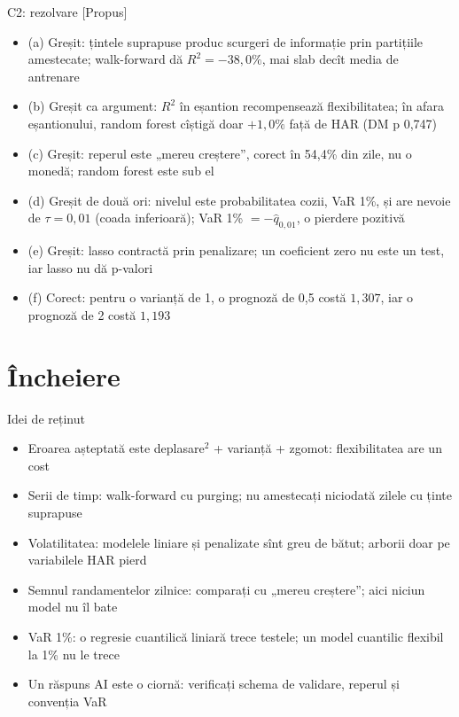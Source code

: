 \ifsolutions
\begin{frame}{C2: rezolvare [Propus]}
\itemsize{\footnotesize}
\begin{itemize}
    \item (a) Greșit: țintele suprapuse produc scurgeri de informație prin partițiile amestecate; walk-forward dă $R^2 = -38{,}0\%$, mai slab decît media de antrenare
    \item (b) Greșit ca argument: $R^2$ în eșantion recompensează flexibilitatea; în afara eșantionului, random forest cîștigă doar $+1{,}0\%$ față de HAR (DM p 0{,}747)
    \item (c) Greșit: reperul este „mereu creștere”, corect în 54{,}4\% din zile, nu o monedă; random forest este sub el
    \item (d) Greșit de două ori: nivelul este probabilitatea cozii, VaR 1\%, și are nevoie de $\tau = 0{,}01$ (coada inferioară); VaR 1\% $= -\hat q_{0{,}01}$, o pierdere pozitivă
    \item (e) Greșit: lasso contractă prin penalizare; un coeficient zero nu este un test, iar lasso nu dă p-valori
    \item (f) Corect: pentru o varianță de 1, o prognoză de 0,5 costă $1{,}307$, iar o prognoză de 2 costă $1{,}193$
\end{itemize}
\end{frame}
\fi


\section{Încheiere}

\begin{frame}{Idei de reținut}
\itemsize{\small}
\begin{itemize}
    \item Eroarea așteptată este deplasare$^2$ + varianță + zgomot: flexibilitatea are un cost
    \item Serii de timp: walk-forward cu purging; nu amestecați niciodată zilele cu ținte suprapuse
    \item Volatilitatea: modelele liniare și penalizate sînt greu de bătut; arborii doar pe variabilele HAR pierd
    \item Semnul randamentelor zilnice: comparați cu „mereu creștere”; aici niciun model nu îl bate
    \item VaR 1\%: o regresie cuantilică liniară trece testele; un model cuantilic flexibil la 1\% nu le trece
    \item Un răspuns AI este o ciornă: verificați schema de validare, reperul și convenția VaR
\end{itemize}
\end{frame}

